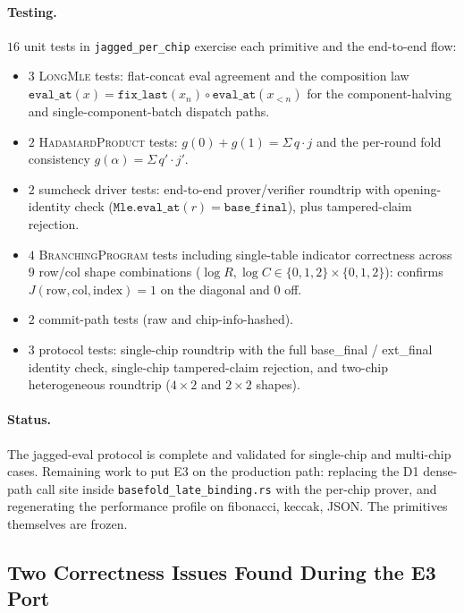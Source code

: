 \paragraph{Testing.}  $16$ unit tests in \texttt{jagged\_per\_chip}
exercise each primitive and the end-to-end flow:
\begin{itemize}
  \item $3$ \textsc{LongMle} tests: flat-concat eval agreement and
        the composition law $\texttt{eval\_at}(x) =
        \texttt{fix\_last}(x_n) \circ \texttt{eval\_at}(x_{<n})$
        for the component-halving and single-component-batch
        dispatch paths.
  \item $2$ \textsc{HadamardProduct} tests: $g(0) + g(1) =
        \Sigma \, q \cdot j$ and the per-round fold consistency
        $g(\alpha) = \Sigma \, q' \cdot j'$.
  \item $2$ sumcheck driver tests: end-to-end prover/verifier
        roundtrip with opening-identity check
        ($\texttt{Mle.eval\_at}(r) = \texttt{base\_final}$), plus
        tampered-claim rejection.
  \item $4$ \textsc{BranchingProgram} tests including single-table
        indicator correctness across $9$ row/col shape combinations
        (\mbox{$\log R, \log C \in \{0, 1, 2\} \times \{0, 1, 2\}$}):
        confirms $J(\mathrm{row}, \mathrm{col}, \mathrm{index}) = 1$
        on the diagonal and $0$ off.
  \item $2$ commit-path tests (raw and chip-info-hashed).
  \item $3$ protocol tests: single-chip roundtrip with the full
        base\_final / ext\_final identity check, single-chip
        tampered-claim rejection, and two-chip heterogeneous
        roundtrip ($4{\times}2$ and $2{\times}2$ shapes).
\end{itemize}

\paragraph{Status.}  The jagged-eval protocol is complete and
validated for single-chip and multi-chip cases.  Remaining work to
put E3 on the production path: replacing the D1 dense-path call
site inside \texttt{basefold\_late\_binding.rs} with the per-chip
prover, and regenerating the performance profile on fibonacci,
keccak, JSON.  The primitives themselves are frozen.

\subsection{Two Correctness Issues Found During the E3 Port}

